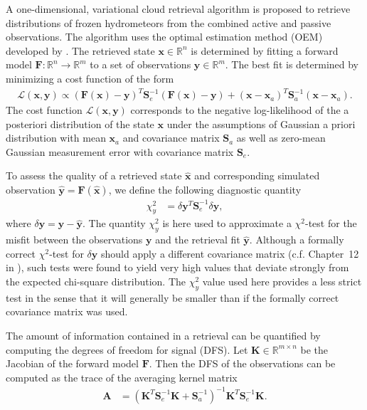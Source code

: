 \documentclass[journal abbreviation, manuscript]{copernicus}
\begin{document}
A one-dimensional, variational cloud retrieval algorithm is proposed to
retrieve distributions of frozen hydrometeors from the combined active and
passive observations. The algorithm uses the optimal estimation method (OEM)
developed by \cite{rodgers00}. The retrieved state $\mathbf{x} \in
   \mathbb{R}^n$ is determined by fitting a forward model $\mathbf{F} : \mathbb{R}^n
   \rightarrow \mathbb{R}^m$ to a set of observations $\mathbf{y} \in
   \mathbb{R}^m$. The best fit is determined by minimizing a cost function of
the form
\begin{align}
\mathcal{L}(\mathbf{x}, \mathbf{y}) \propto
 \left(\mathbf{F}(\mathbf{x}) - \mathbf{y} \right )^T
  \mathbf{S}_e^{-1} 
  \left ( \mathbf{F}(\mathbf{x}) - \mathbf{y} \right)
+ \left ( \mathbf{x} - \mathbf{x}_a \right )^T
 \mathbf{S}^{-1}_a 
 \left ( \mathbf{x} - \mathbf{x}_a \right ).
\end{align}
%
The cost function $\mathcal{L}(\mathbf{x}, \mathbf{y})$ corresponds to the negative
log-likelihood of the a posteriori distribution of the state $\mathbf{x}$ under
the assumptions of Gaussian a priori distribution with mean $\mathbf{x}_a$ and
covariance matrix $\mathbf{S}_a$ as well as zero-mean Gaussian measurement error
with covariance matrix $\mathbf{S}_e$.

To assess the quality of a retrieved state $\hat{\mathbf{x}}$ and corresponding simulated
observation $\hat{\mathbf{y}} = \mathbf{F}(\hat{\mathbf{x}})$, we define the following diagnostic
quantity
\begin{align}
\chi^2_y &= \delta \mathbf{y}^T
  \mathbf{S}_e^{-1} 
  \delta \mathbf{y},
\end{align}
where $\delta \mathbf{y} = \mathbf{y} - \hat{\mathbf{y}}$. The quantity
$\chi^2_y$ is here used to approximate a $\chi^2$-test for the misfit between
the observations $\mathbf{y}$ and the retrieval fit $\hat{\mathbf{y}}$. Although
a formally correct $\chi^2$-test for $\delta\mathbf{y}$ should apply a different
covariance matrix (c.f. Chapter~12 in \cite{rodgers00}), such tests were found
to yield very high values that deviate strongly from the expected chi-square
distribution. The $\chi^2_y$ value used here provides a less strict test in the
sense that it will generally be smaller than if the formally correct covariance
matrix was used.

The amount of information contained in a retrieval can be quantified by
computing the degrees of freedom for signal (DFS). Let $\mathbf{K} \in
\mathbb{R}^{m \times n}$ be the Jacobian of the forward model $\mathbf{F}$. Then
the DFS of the observations can be computed as the trace of the averaging kernel
matrix
\begin{align}
  \mathbf{A} &=(\mathbf{K}^T\mathbf{S}_e^{-1}\mathbf{K} + \mathbf{S}_a^{-1})^{-1}
  \mathbf{K}^T\mathbf{S}_e^{-1}\mathbf{K}.
\end{align}
\end{document}
